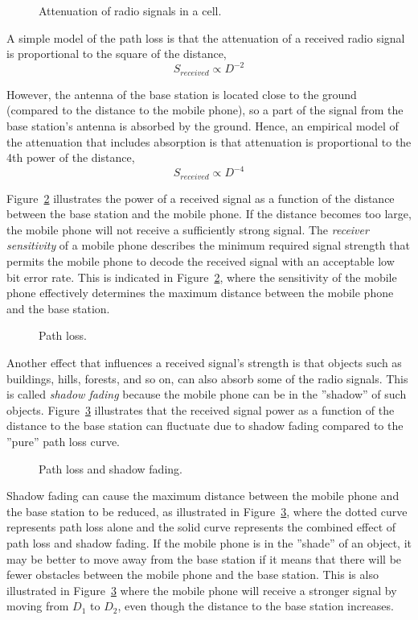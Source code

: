 \begin{figure}[htbp]
\centering
{}
\caption{\label{fig:pathloss_scenario}Attenuation of radio signals in a cell.}
\end{figure}

A simple model of the path loss is that the attenuation of a received radio signal is proportional to the square of the distance, \ie
\[
S_{received}\propto{}D^{-2}
\]

However, the antenna of the base station is located close to the ground (compared to the distance to the mobile phone), so a part of the signal from the base station's antenna is absorbed by the ground. Hence, an empirical model of the attenuation that includes absorption is that attenuation is proportional to the 4th power of the distance, \ie
\[
S_{received}\propto{}D^{-4}
\]

Figure~\ref{fig:pathloss} illustrates the power of a received signal as a function of the distance between the base station and the mobile phone. If the distance becomes too large, the mobile phone will not receive a sufficiently strong signal. The \emph{receiver sensitivity} of a mobile phone describes the minimum required signal strength that permits the mobile phone to decode the received signal with an acceptable low bit error rate. This is indicated in Figure~\ref{fig:pathloss}, where the sensitivity of the mobile phone effectively determines the maximum distance between the mobile phone and the base station.

\begin{figure}
\centering
{}
\caption{\label{fig:pathloss}Path loss.}
\end{figure}

Another effect that influences a received signal's strength is that objects such as buildings, hills, forests, and so on, can also absorb some of the radio signals. This is called \emph{shadow fading} because the mobile phone can be in the ''shadow'' of such objects. Figure~\ref{fig:shadowfading} illustrates that the received signal power as a function of the distance to the base station can fluctuate due to shadow fading compared to the ''pure'' path loss curve.
\begin{figure}
\centering
{}
\caption{\label{fig:shadowfading}Path loss and shadow fading.}
\end{figure}

Shadow fading can cause the maximum distance between the mobile phone and the base station to be reduced, as illustrated in Figure~\ref{fig:shadowfading}, where the dotted curve represents path loss alone and the solid curve represents the combined effect of path loss and shadow fading. If the mobile phone is in the ''shade'' of an object, it may be better to move away from the base station if it means that there will be fewer obstacles between the mobile phone and the base station. This is also illustrated in Figure~\ref{fig:shadowfading} where the mobile phone will receive a stronger signal by moving from $D_1$ to $D_2$, even though the distance to the base station increases.

